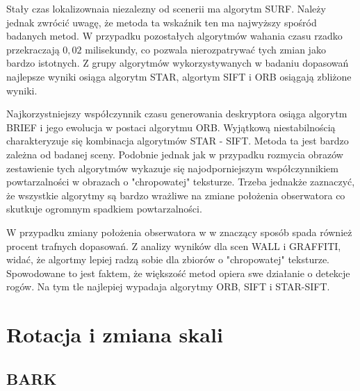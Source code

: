 Stały czas lokalizownaia niezalezny od scenerii ma algorytm SURF. Należy jednak zwrócić uwagę, że metoda ta wskaźnik ten ma najwyższy spośród badanych metod. W przypadku pozostałych algorytmów wahania czasu rzadko przekraczają $0,02$  milisekundy, co pozwala nierozpatrywać tych zmian jako bardzo istotnych. Z grupy algorytmów wykorzystywanych w badaniu dopasowań najlepsze wyniki osiąga algorytm STAR, algortym SIFT i ORB osiągają zbliżone wyniki.

Najkorzystniejszy współczynnik czasu generowania deskryptora osiąga algorytm BRIEF i jego ewolucja w postaci algorytmu ORB. Wyjątkową niestabilnością charakteryzuje się kombinacja algorytmów STAR - SIFT. Metoda ta jest bardzo zależna od badanej sceny. Podobnie jednak jak w przypadku rozmycia obrazów zestawienie tych algorytmów wykazuje się najodporniejszym współczynnikiem powtarzalności w obrazach o "chropowatej" teksturze. Trzeba jednakże zaznaczyć, że wszystkie algorytmy są bardzo wrażliwe na zmiane położenia obserwatora co skutkuje ogromnym spadkiem powtarzalności.

W przypadku zmiany położenia obserwatora w w znaczący sposób spada również procent trafnych dopasowań. Z analizy wyników dla scen WALL i GRAFFITI, widać, że algortmy lepiej radzą sobie dla zbiorów o "chropowatej" teksturze. Spowodowane to jest faktem, że większość metod opiera swe działanie o detekcje rogów. Na tym tle najlepiej wypadaja algorytmy ORB, SIFT i STAR-SIFT.







\FloatBarrier

\section{Rotacja i zmiana skali}
\FloatBarrier
\subsection{BARK}

